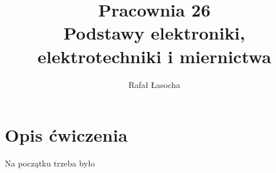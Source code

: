 \documentclass[a4paper,11pt]{article}
\title{
  \textbf{Pracownia 26}\\
  {\Large Podstawy elektroniki, elektrotechniki i miernictwa}
}
\author{Rafał Łasocha}
\begin{document}
 \maketitle
 
 \section{Opis ćwiczenia}
 Na początku trzeba było
\end{document}
